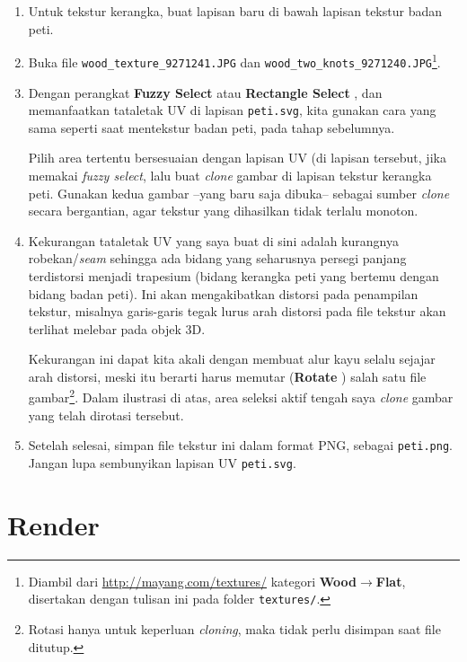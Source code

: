 \documentclass[11pt]{report}
\def\key#1{\fbox{\bfseries\ttfamily#1}}
\def\ke{$\to$}
\begin{document}
\begin{enumerate}
\item Untuk tekstur kerangka, buat lapisan baru di bawah lapisan tekstur badan peti.

\item Buka file \texttt{wood\_texture\_9271241.JPG} dan \texttt{wood\_two\_knots\_9271240.JPG}\footnote{Diambil dari \url{http://mayang.com/textures/} kategori \textbf{Wood}\ke\textbf{Flat}, disertakan dengan tulisan ini pada folder \texttt{textures/}.}.

\item Dengan perangkat \textbf{Fuzzy Select} \key{U} atau \textbf{Rectangle Select} \key{R}, dan memanfaatkan tataletak UV di lapisan \texttt{peti.svg}, kita gunakan cara yang sama seperti saat mentekstur badan peti, pada tahap sebelumnya.

  Pilih area tertentu bersesuaian dengan lapisan UV (di lapisan tersebut, jika memakai \textsl{fuzzy select}, lalu buat \textsl{clone} gambar di lapisan tekstur kerangka peti. Gunakan kedua gambar --yang baru saja dibuka-- sebagai sumber \textsl{clone} secara bergantian, agar tekstur yang dihasilkan tidak terlalu monoton.

\item Kekurangan tataletak UV yang saya buat di sini adalah kurangnya robekan/\textsl{seam} sehingga ada bidang yang seharusnya persegi panjang terdistorsi menjadi trapesium (bidang kerangka peti yang bertemu dengan bidang badan peti). Ini akan mengakibatkan distorsi pada penampilan tekstur, misalnya garis-garis tegak lurus arah distorsi pada file tekstur akan terlihat melebar pada objek 3D.

  Kekurangan ini dapat kita akali dengan membuat alur kayu selalu sejajar arah distorsi, meski itu berarti harus memutar (\textbf{Rotate} \key{Shift-R}) salah satu file gambar\footnote{Rotasi hanya untuk keperluan \emph{cloning}, maka tidak perlu disimpan saat file ditutup.}. Dalam ilustrasi di atas, area seleksi aktif tengah saya \emph{clone} gambar yang telah dirotasi tersebut.

\item Setelah selesai, simpan file tekstur ini dalam format PNG, sebagai \texttt{peti.png}. Jangan lupa sembunyikan lapisan UV \texttt{peti.svg}.
\end{enumerate}

\section{Render}
\end{document}
